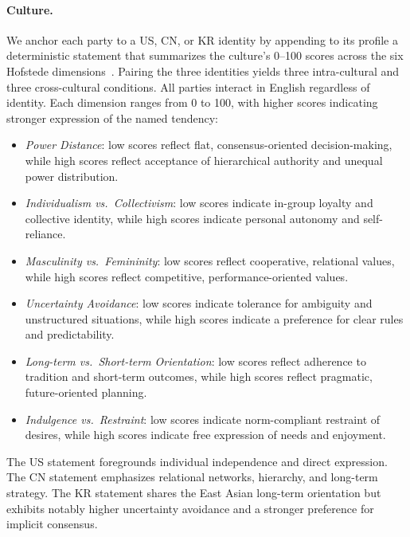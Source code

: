 \documentclass{llmxive}
\begin{document}
\paragraph{Culture.}
We anchor each party to a US, CN, or KR identity by appending to its profile a deterministic statement that summarizes the culture's 0--100 scores across the six Hofstede dimensions~\citep{hofstede2010cultures}. Pairing the three identities yields three intra-cultural and three cross-cultural conditions. All parties interact in English regardless of identity.
%
Each dimension ranges from 0 to 100, with higher scores indicating stronger expression of the named tendency:
\begin{itemize}[leftmargin=*, noitemsep, topsep=2pt]
    \item \emph{Power Distance}: low scores reflect flat, consensus-oriented decision-making, while high scores reflect acceptance of hierarchical authority and unequal power distribution.
    \item \emph{Individualism vs.\ Collectivism}: low scores indicate in-group loyalty and collective identity, while high scores indicate personal autonomy and self-reliance.
    \item \emph{Masculinity vs.\ Femininity}: low scores reflect cooperative, relational values, while high scores reflect competitive, performance-oriented values.
    \item \emph{Uncertainty Avoidance}: low scores indicate tolerance for ambiguity and unstructured situations, while high scores indicate a preference for clear rules and predictability.
    \item \emph{Long-term vs.\ Short-term Orientation}: low scores reflect adherence to tradition and short-term outcomes, while high scores reflect pragmatic, future-oriented planning.
    \item \emph{Indulgence vs.\ Restraint}: low scores indicate norm-compliant restraint of desires, while high scores indicate free expression of needs and enjoyment.
\end{itemize}
%
The US statement foregrounds individual independence and direct expression. The CN statement emphasizes relational networks, hierarchy, and long-term strategy. The KR statement shares the East Asian long-term orientation but exhibits notably higher uncertainty avoidance and a stronger preference for implicit consensus.

\end{document}
